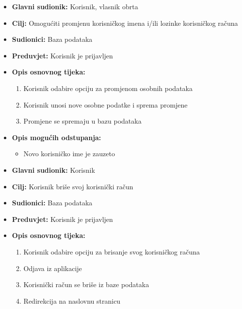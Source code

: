 			\noindent{}
				\begin{itemize}
					\item \textbf{Glavni sudionik: } Korisnik, vlasnik obrta 
					\item \textbf{Cilj: }Omogućiti promjenu korisničkog imena i/ili lozinke korisničkog računa 
					\item \textbf{Sudionici: } Baza podataka 
					\item \textbf{Preduvjet: } Korisnik je prijavljen 
					\item \textbf{Opis osnovnog tijeka: }
					\begin{enumerate}
						\item Korisnik odabire opciju za promjenom osobnih podataka
						\item Korisnik unosi nove osobne podatke i sprema promjene
						\item Promjene se spremaju u bazu podataka
					\end{enumerate}
					\item \textbf{Opis mogućih odstupanja:}
					\begin{itemize}
						\item Novo korisničko ime je zauzeto
					\end{itemize}
				\end{itemize}
					
			\noindent{}
				\begin{itemize}
					\item \textbf{Glavni sudionik: } Korisnik
					\item \textbf{Cilj: }Korisnik briše svoj korisnički račun
					\item \textbf{Sudionici: } Baza podataka 
					\item \textbf{Preduvjet: } Korisnik je prijavljen 
					\item \textbf{Opis osnovnog tijeka: }
					\begin{enumerate}
						\item Korisnik odabire opciju za brisanje svog korisničkog računa
						\item Odjava iz aplikacije
						\item Korisnički račun se briše iz baze podataka
						\item Redirekcija na naslovnu stranicu
					\end{enumerate}
				\end{itemize}
					
